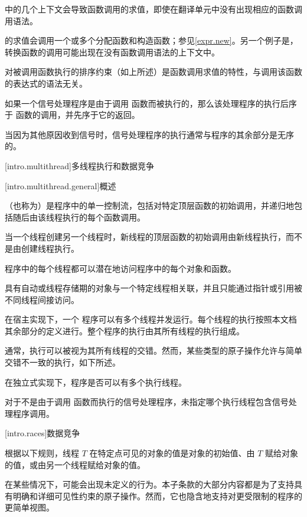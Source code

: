 \Cpp{} 中的几个上下文会导致函数调用的求值，即使在翻译单元中没有出现相应的函数调用语法。
\begin{example}
 的求值会调用一个或多个分配函数和构造函数；参见\ref{expr.new}。另一个例子是，转换函数的调用可能出现在没有函数调用语法的上下文中。
\end{example}
对被调用函数执行的排序约束（如上所述）是函数调用求值的特性，与调用该函数的表达式的语法无关。%
%

%
%
\pnum
如果一个信号处理程序是由于调用  函数而被执行的，那么该处理程序的执行后序于  函数的调用，并先序于它的返回。
\begin{note}
当因为其他原因收到信号时，信号处理程序的执行通常与程序的其余部分是无序的。
\end{note}

[intro.multithread]{多线程执行和数据竞争}

[intro.multithread.general]{概述}

\pnum
{}%
%
（也称为）是程序中的单一控制流，包括对特定顶层函数的初始调用，并递归地包括随后由该线程执行的每个函数调用。
\begin{note}
当一个线程创建另一个线程时，新线程的顶层函数的初始调用由新线程执行，而不是由创建线程执行。
\end{note}
程序中的每个线程都可以潜在地访问程序中的每个对象和函数。
\begin{footnote}
具有自动或线程存储期的对象与一个特定线程相关联，并且只能通过指针或引用被不同线程间接访问。
\end{footnote}
在宿主实现下，一个 \Cpp{} 程序可以有多个线程并发运行。每个线程的执行按照本文档其余部分的定义进行。整个程序的执行由其所有线程的执行组成。
\begin{note}
通常，执行可以被视为其所有线程的交错。然而，某些类型的原子操作允许与简单交错不一致的执行，如下所述。
\end{note}
%
在独立式实现下，程序是否可以有多个执行线程。

\pnum
对于不是由于调用  函数而执行的信号处理程序，未指定哪个执行线程包含信号处理程序调用。

[intro.races]{数据竞争}

\pnum
根据以下规则，线程 $T$ 在特定点可见的对象的值是对象的初始值、由 $T$ 赋给对象的值，或由另一个线程赋给对象的值。
\begin{note}
在某些情况下，可能会出现未定义的行为。本子条款的大部分内容都是为了支持具有明确和详细可见性约束的原子操作。然而，它也隐含地支持对更受限制的程序的更简单视图。
\end{note}

